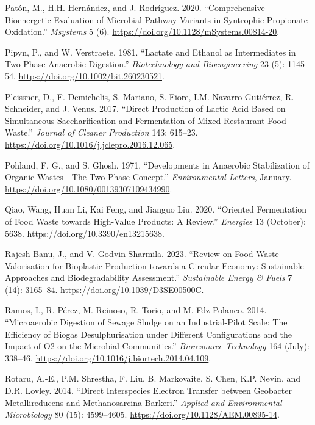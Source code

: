 \documentclass[11pt]{report}
\begin{document}
\begin{hangparas}{1.5em}{1}
\hypertarget{citeproc_bib_item_56}{Patón, M., H.H. Hernández, and J. Rodríguez. 2020. “Comprehensive Bioenergetic Evaluation of Microbial Pathway Variants in Syntrophic Propionate Oxidation.” \textit{Msystems} 5 (6). \url{https://doi.org/10.1128/mSystems.00814-20}.}

\hypertarget{citeproc_bib_item_57}{Pipyn, P., and W. Verstraete. 1981. “Lactate and Ethanol as Intermediates in Two-Phase Anaerobic Digestion.” \textit{Biotechnology and Bioengineering} 23 (5): 1145–54. \url{https://doi.org/10.1002/bit.260230521}.}

\hypertarget{citeproc_bib_item_58}{Pleissner, D., F. Demichelis, S. Mariano, S. Fiore, I.M. Navarro Gutiérrez, R. Schneider, and J. Venus. 2017. “Direct Production of Lactic Acid Based on Simultaneous Saccharification and Fermentation of Mixed Restaurant Food Waste.” \textit{Journal of Cleaner Production} 143: 615–23. \url{https://doi.org/10.1016/j.jclepro.2016.12.065}.}

\hypertarget{citeproc_bib_item_59}{Pohland, F. G., and S. Ghosh. 1971. “Developments in Anaerobic Stabilization of Organic Wastes - The Two-Phase Concept.” \textit{Environmental Letters}, January. \url{https://doi.org/10.1080/00139307109434990}.}

\hypertarget{citeproc_bib_item_60}{Qiao, Wang, Huan Li, Kai Feng, and Jianguo Liu. 2020. “Oriented Fermentation of Food Waste towards High-Value Products: A Review.” \textit{Energies} 13 (October): 5638. \url{https://doi.org/10.3390/en13215638}.}

\hypertarget{citeproc_bib_item_61}{Rajesh Banu, J., and V. Godvin Sharmila. 2023. “Review on Food Waste Valorisation for Bioplastic Production towards a Circular Economy: Sustainable Approaches and Biodegradability Assessment.” \textit{Sustainable Energy \& Fuels} 7 (14): 3165–84. \url{https://doi.org/10.1039/D3SE00500C}.}

\hypertarget{citeproc_bib_item_62}{Ramos, I., R. Pérez, M. Reinoso, R. Torio, and M. Fdz-Polanco. 2014. “Microaerobic Digestion of Sewage Sludge on an Industrial-Pilot Scale: The Efficiency of Biogas Desulphurisation under Different Configurations and the Impact of O2 on the Microbial Communities.” \textit{Bioresource Technology} 164 (July): 338–46. \url{https://doi.org/10.1016/j.biortech.2014.04.109}.}

\hypertarget{citeproc_bib_item_63}{Rotaru, A.-E., P.M. Shrestha, F. Liu, B. Markovaite, S. Chen, K.P. Nevin, and D.R. Lovley. 2014. “Direct Interspecies Electron Transfer between Geobacter Metallireducens and Methanosarcina Barkeri.” \textit{Applied and Environmental Microbiology} 80 (15): 4599–4605. \url{https://doi.org/10.1128/AEM.00895-14}.}


\end{hangparas}
\end{document}
